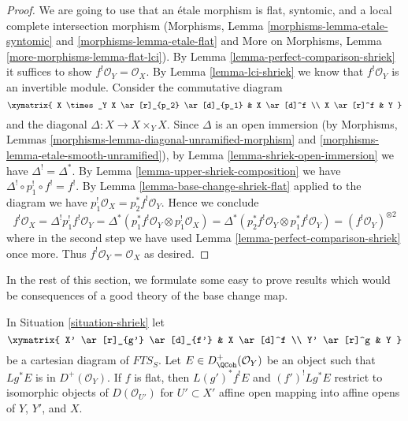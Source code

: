 \begin{proof}
We are going to use that an \'etale morphism is flat, syntomic,
and a local complete intersection morphism
(Morphisms, Lemma \ref{morphisms-lemma-etale-syntomic} and
\ref{morphisms-lemma-etale-flat} and
More on Morphisms, Lemma \ref{more-morphisms-lemma-flat-lci}).
By Lemma \ref{lemma-perfect-comparison-shriek} it suffices
to show $f^!\mathcal{O}_Y = \mathcal{O}_X$.
By Lemma \ref{lemma-lci-shriek} we know that $f^!\mathcal{O}_Y$
is an invertible module. Consider the commutative diagram
$$
\xymatrix{
X \times_Y X \ar[r]_{p_2} \ar[d]_{p_1} & X \ar[d]^f \\
X \ar[r]^f & Y
}
$$
and the diagonal $\Delta : X \to X \times_Y X$. Since $\Delta$
is an open immersion (by Morphisms, Lemmas
\ref{morphisms-lemma-diagonal-unramified-morphism} and
\ref{morphisms-lemma-etale-smooth-unramified}), by
Lemma \ref{lemma-shriek-open-immersion} we have $\Delta^! = \Delta^*$.
By Lemma \ref{lemma-upper-shriek-composition} we have
$\Delta^! \circ p_1^! \circ f^! = f^!$.
By Lemma \ref{lemma-base-change-shriek-flat} applied to
the diagram we have $p_1^!\mathcal{O}_X = p_2^*f^!\mathcal{O}_Y$.
Hence we conclude
$$
f^!\mathcal{O}_X = \Delta^!p_1^!f^!\mathcal{O}_Y =
\Delta^*(p_1^*f^!\mathcal{O}_Y \otimes p_1^!\mathcal{O}_X) =
\Delta^*(p_2^*f^!\mathcal{O}_Y \otimes p_1^*f^!\mathcal{O}_Y) =
(f^!\mathcal{O}_Y)^{\otimes 2}
$$
where in the second step we have used
Lemma \ref{lemma-perfect-comparison-shriek} once more.
Thus $f^!\mathcal{O}_Y = \mathcal{O}_X$ as desired.
\end{proof}


\noindent
In the rest of this section, we formulate some easy to prove
results which would be consequences of a good theory of the
base change map.

\begin{lemma}
\label{lemma-base-change-locally}
In Situation \ref{situation-shriek} let
$$
\xymatrix{
X' \ar[r]_{g'} \ar[d]_{f'} & X \ar[d]^f \\
Y' \ar[r]^g & Y
}
$$
be a cartesian diagram of $\textit{FTS}_S$.
Let $E \in D^+_\QCoh(\mathcal{O}_Y)$ be an object
such that $Lg^*E$ is in $D^+(\mathcal{O}_Y)$.
If $f$ is flat, then $L(g')^*f^!E$ and $(f')^!Lg^*E$
restrict to isomorphic objects of $D(\mathcal{O}_{U'})$
for $U' \subset X'$ affine open mapping into affine opens of $Y$, $Y'$, and $X$.
\end{lemma}

